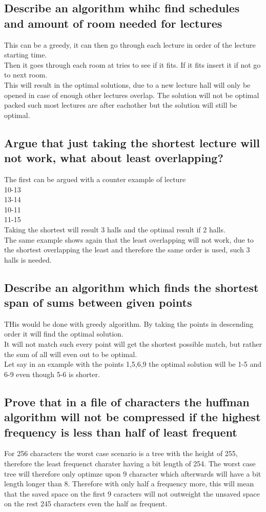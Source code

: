 \documentclass[12pt, a4paper]{article}
\begin{document}
		\subsection{Describe an algorithm whihc find schedules and amount of room needed for lectures}
			This can be a greedy, it can then go through each lecture in order of the lecture starting time.\\
			Then it goes through each room at tries to see if it fits. If it fits insert it if not go to next room.\\
			This will result in the optimal solutions, due to a new lecture hall will only be opened in case of enough other lectures overlap. The solution will not be optimal packed such most lectures are after eachother but the solution will still be optimal.
		\subsection{Argue that just taking the shortest lecture will not work, what about least overlapping?}
			The first can be argued with a counter example of lecture\\
			10-13\\
			13-14\\
			10-11\\
			11-15\\
			Taking the shortest will result 3 halls and the optimal result if 2 halls.\\
			The same example shows again that the least overlapping will not work, due to the shortest overlapping the least and therefore the same order is used, such 3 halls is needed.
		\subsection{Describe an algorithm which finds the shortest span of sums between given points}
			THis would be done with greedy algorithm. By taking the points in descending order it will find the optimal solution.\\
			It will not match such every point will get the shortest possible match, but rather the sum of all will even out to be optimal.\\
			Let say in an example with the points 1,5,6,9 the optimal solution will be 1-5 and 6-9 even though 5-6 is shorter.
		\subsection{Prove that in a file of characters the huffman algorithm will not be compressed if the highest frequency is less than half of least frequent}
			For 256 characters the worst case scenario is a tree with the height of 255, therefore the least frequenct charater having a bit length of 254. The worst case tree will therefore only optimze upon 9 character which afterwards will have a bit length longer than 8. Therefore with only half a frequency more, this will mean that the saved space on the first 9 caracters will not outweight the unsaved space on the rest 245 characters even the half as frequent.
\end{document}
